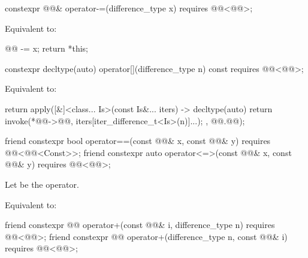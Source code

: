 \begin{itemdecl}
constexpr @@& operator-=(difference_type x)
  requires @@<@@>;
\end{itemdecl}

\begin{itemdescr}
\pnum
\effects
Equivalent to:
\begin{codeblock}
@@ -= x;
return *this;
\end{codeblock}
\end{itemdescr}

\begin{itemdecl}
constexpr decltype(auto) operator[](difference_type n) const
  requires @@<@@>;
\end{itemdecl}

\begin{itemdescr}
\pnum
\effects
Equivalent to:
\begin{codeblock}
return apply([&]<class... Is>(const Is&... iters) -> decltype(auto) {
  return invoke(*@@->@@, iters[iter_difference_t<Is>(n)]...);
}, @@.@@);
\end{codeblock}
\end{itemdescr}

\begin{itemdecl}
friend constexpr bool operator==(const @@& x, const @@& y)
  requires @@<@@<Const>>;
friend constexpr auto operator<=>(const @@& x, const @@& y)
  requires @@<@@>;
\end{itemdecl}

\begin{itemdescr}
\pnum
Let  be the operator.

\pnum
\effects
Equivalent to:
\end{itemdescr}

\begin{itemdecl}
friend constexpr @@ operator+(const @@& i, difference_type n)
  requires @@<@@>;
friend constexpr @@ operator+(difference_type n, const @@& i)
  requires @@<@@>;
\end{itemdecl}

